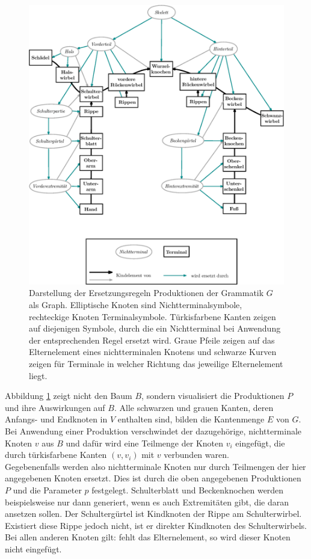  \begin{figure}
  \includegraphics[width=\textwidth]{graphics/grammarGraph}
  \caption{Darstellung der Ersetzungsregeln \bzw Produktionen der Grammatik $G$ als Graph. Elliptische Knoten sind Nichtterminalsymbole, rechteckige Knoten Terminalsymbole. Türkisfarbene Kanten zeigen auf diejenigen Symbole, durch die ein Nichtterminal bei Anwendung der entsprechenden Regel ersetzt wird. Graue Pfeile zeigen auf das Elternelement eines nichtterminalen Knotens und schwarze Kurven zeigen für Terminale in welcher Richtung das jeweilige Elternelement liegt.}
  \label{grammar_graph}
 \end{figure}
 

Abbildung \ref{grammar_graph} zeigt nicht den Baum $B$, sondern visualisiert die Produktionen $P$ und ihre Auswirkungen auf $B$. Alle schwarzen und grauen Kanten, deren Anfangs- und Endknoten in $V$ enthalten sind, bilden die Kantenmenge $E$ von $G$. Bei Anwendung einer Produktion verschwindet der dazugehörige, nichtterminale Knoten $v$ aus $B$ und dafür wird eine Teilmenge der Knoten $v_i$ eingefügt, die durch türkisfarbene Kanten $(v, v_i)$ mit $v$ verbunden waren.\\
Gegebenenfalls werden also nichtterminale Knoten nur durch Teilmengen der hier angegebenen Knoten ersetzt. Dies ist durch die oben angegebenen Produktionen $P$ und die Parameter $p$ festgelegt. Schulterblatt und Beckenknochen werden beispielsweise nur dann generiert, wenn es auch Extremitäten gibt, die daran ansetzen sollen. Der Schultergürtel ist Kindknoten der Rippe am Schulterwirbel. Existiert diese Rippe jedoch nicht, ist er direkter Kindknoten des Schulterwirbels. Bei allen anderen Knoten gilt: fehlt das Elternelement, so wird dieser Knoten nicht eingefügt.


